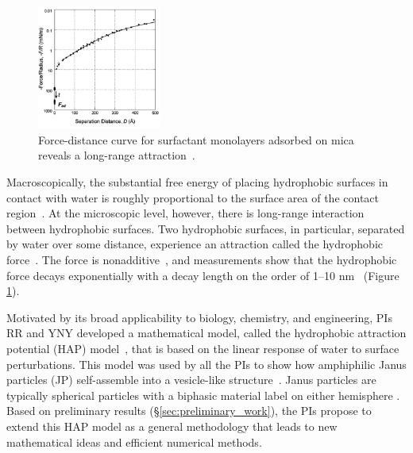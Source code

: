 \begin{figure}
\vspace{-8pt}
\centerline
{
\includegraphics[width=0.36\textwidth]{figures/Background/LongRangeForce.jpg}
}
\caption{\label{fig:force_distance}
Force-distance curve for surfactant
monolayers adsorbed on mica reveals a long-range
attraction~\cite{Lin2005}.}
\end{figure}

Macroscopically, the substantial free energy of placing hydrophobic
surfaces in contact with water is roughly proportional to the surface
area of the contact region~\cite{Bjorneholm2016}.
At the microscopic level, however, there is long-range interaction
between hydrophobic surfaces. Two hydrophobic surfaces, in particular,
separated by water over some distance, experience an attraction
called the
hydrophobic force~\cite{Lum1999, Meyer2006, Hammer2010, KaScScNe16}.
The force is nonadditive~\cite{SilveraBatista1242477},
and measurements show that the hydrophobic force decays exponentially with a
decay length on the order of 1--10 nm~
\cite{Israelachvili1984,Marcelja1977,Christenson2001,Lin2005,Taetal13}
(Figure \ref{fig:force_distance}).


Motivated by its broad applicability to biology, chemistry, and engineering,
PIs RR and YNY developed a mathematical model, called the
hydrophobic attraction potential (HAP) model~\cite{Fu2018_SIAM},
that is based on
the linear response of water to surface perturbations. This model was
used by all the PIs to show how amphiphilic Janus particles (JP)
self-assemble into a vesicle-like structure~\cite{FuQuRyYo20}.
Janus particles are typically spherical particles with a biphasic
material label on either hemisphere \cite{CaFaRaVe89,Gaetal13,Mallory2017,HaBr20,McBr21}.
Based on
preliminary results (\S\ref{sec:preliminary_work}), the PIs propose to
extend this HAP model as a general methodology that leads
to new mathematical ideas and efficient numerical methods.

